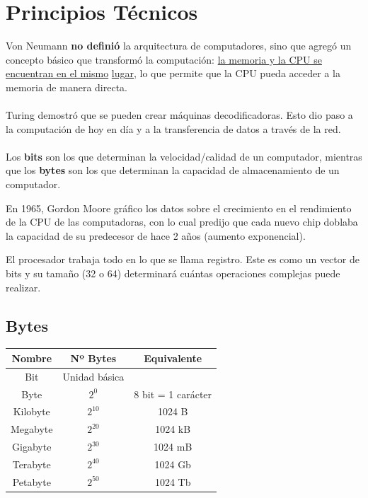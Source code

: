 \documentclass{templateNote}
\begin{document}
\section{Principios Técnicos}
\noindent Von Neumann \textbf{no definió} la arquitectura de computadores, sino que agregó un concepto básico que transformó la computación: \underline{la memoria y la CPU se encuentran en el mismo} \underline{lugar}, lo que permite que la CPU pueda acceder a la memoria de manera directa. 
\\\\
Turing demostró que se pueden crear máquinas decodificadoras. Esto dio paso a la computación de hoy en día y a la transferencia de datos a través de la red.
\\\\
Los \textbf{bits} son los que determinan la velocidad/calidad de un computador, mientras que los \textbf{bytes} son los que determinan la capacidad de almacenamiento de un computador.

\begin{tcolorbox}[colback=blue!5!white,colframe=blue!75!black,title=Ley de Moore]
En 1965, Gordon Moore gráfico los datos sobre el crecimiento en el rendimiento de la CPU de las computadoras, con lo cual predijo que cada nuevo chip doblaba la capacidad de su predecesor de hace 2 años (aumento exponencial).
\end{tcolorbox}

\noindent El procesador trabaja todo en lo que se llama registro. Este es como un vector de bits y su tamaño (32 o 64) determinará cuántas operaciones complejas puede realizar.

\subsection{Bytes}
\begin{table} [H]
    \centering
        \renewcommand{\arraystretch}{1.5} %
        \begin{tabular}{|c|c|c|}
            \hline
            \textbf{Nombre} & \textbf{Nº Bytes} & \textbf{Equivalente}\\
            \hline
            Bit & Unidad básica &\\
            \hline
            Byte & $\displaystyle 2^0$ & 8 bit = 1 carácter \\
            \hline
            Kilobyte & $\displaystyle 2^{10}$ & 1024 B \\
            \hline
            Megabyte & $\displaystyle 2^{20}$ & 1024 kB \\
            \hline
            Gigabyte & $\displaystyle 2^{30}$ & 1024 mB \\
            \hline
            Terabyte & $\displaystyle 2^{40}$ & 1024 Gb \\
            \hline
            Petabyte & $\displaystyle 2^{50}$ & 1024 Tb \\
            \hline
        \end{tabular}
    \label{tab:componentes}
\end{table}
\end{document}
